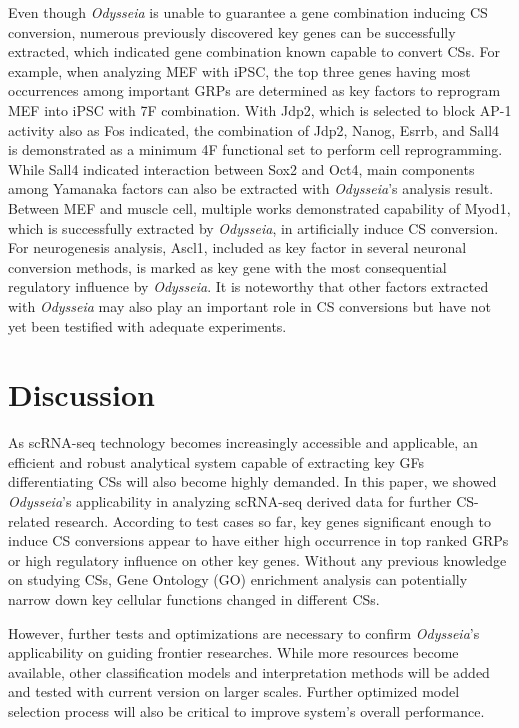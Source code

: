 \documentclass[fleqn,10pt]{wlscirep}
\begin{document}
Even though \emph{Odysseia} is unable to guarantee a gene combination inducing CS conversion, numerous previously discovered key genes can be successfully extracted, which indicated gene combination known capable to convert CSs.
For example, when analyzing MEF with iPSC, the top three genes having most occurrences among important GRPs are determined as key factors to reprogram MEF into iPSC with 7F combination\cite{ips7f}.
With Jdp2, which is selected to block AP-1 activity also as Fos indicated, the combination of Jdp2, Nanog, Esrrb, and Sall4 is demonstrated as a minimum 4F functional set to perform cell reprogramming\cite{ips7f}.
While Sall4 indicated interaction between Sox2 and Oct4\cite{sall4_oct4_sox2}, main components among Yamanaka factors\cite{yamanaka_2006, osk} can also be extracted with \emph{Odysseia}'s analysis result.
Between MEF and muscle cell, multiple works demonstrated capability of Myod1, which is successfully extracted by \emph{Odysseia}, in artificially induce CS conversion.\cite{myod_1990, myod_crispr}
For neurogenesis analysis, Ascl1, included as key factor in several neuronal conversion methods\cite{ascl1_repro,  ascl1_1frepro}, is marked as key gene with the most consequential regulatory influence by \emph{Odysseia}.
It is noteworthy that other factors extracted with \emph{Odysseia} may also play an important role in CS conversions but have not yet been  testified with adequate experiments.


\section*{Discussion}
\label{disc}
As scRNA-seq technology becomes increasingly accessible and applicable, an efficient and robust analytical system capable of extracting key GFs differentiating CSs will also become highly demanded.
In this paper, we showed \emph{Odysseia}'s applicability in analyzing scRNA-seq derived data for further CS-related research.
According to test cases so far, key genes significant enough to induce CS conversions appear to have either high occurrence in top ranked GRPs or high regulatory influence on other key genes.
Without any previous knowledge on studying CSs, Gene Ontology (GO) enrichment analysis can potentially narrow down key cellular functions changed in different CSs.

However, further tests and optimizations are necessary to confirm \emph{Odysseia}'s applicability on guiding frontier researches.
While more resources become available, other classification models and interpretation methods will be added and tested with current version on larger scales.
Further optimized model selection process will also be critical to improve system's overall performance.
\end{document}
